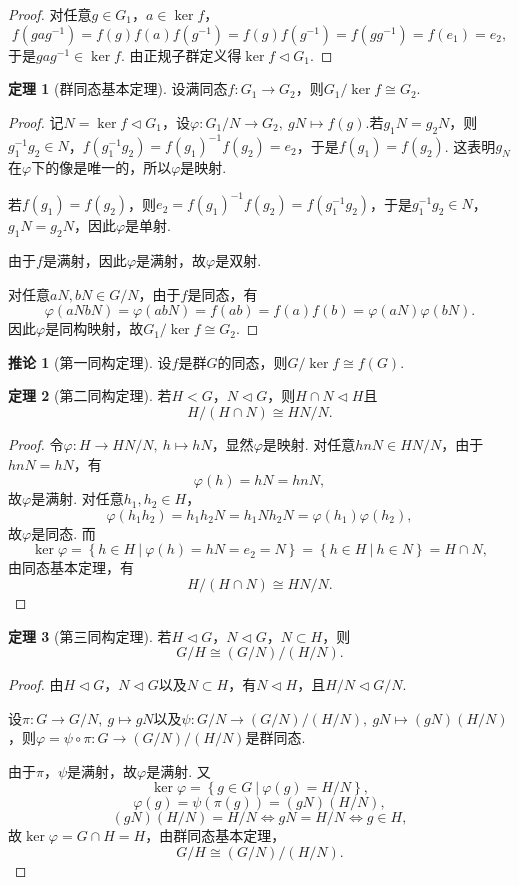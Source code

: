 \documentclass[12pt]{ctexart}
\theoremstyle{definition}
\newtheorem{theorem}{定理}[section]
\newtheorem{corollary}{推论}[section]
\theoremstyle{plain}
\begin{document}
\begin{proof}
	对任意$g\in G_1$，$a\in\ker f$，
	$$f(gag^{-1})=f(g)f(a)f(g^{-1})=f(g)f(g^{-1})=f(gg^{-1})=f(e_1)=e_2,$$
	于是$gag^{-1}\in\ker f$. 由正规子群定义得$\ker f\lhd G_1$.
\end{proof}
\begin{theorem}[群同态基本定理]
	设满同态$f:G_1\to G_2$，则$G_1/\ker f\cong G_2$.
\end{theorem}
\begin{proof}
	记$N=\ker f\lhd G_1$，设$\varphi:G_1/N\to G_2,\ gN\mapsto f(g)$.若$g_1N=g_2N$，则$g_1^{-1}g_2\in N$，$f(g_1^{-1}g_2)=f(g_1)^{-1}f(g_2)=e_2$，于是$f(g_1)=f(g_2)$. 这表明$g_N$在$\varphi$下的像是唯一的，所以$\varphi$是映射.
	
	若$f(g_1)=f(g_2)$，则$e_2=f(g_1)^{-1}f(g_2)=f(g_1^{-1}g_2)$，于是$g_1^{-1}g_2\in N$，$g_1N=g_2N$，因此$\varphi$是单射.
	
	由于$f$是满射，因此$\varphi$是满射，故$\varphi$是双射.
	
	对任意$aN,bN\in G/N$，由于$f$是同态，有
	$$\varphi(aNbN)=\varphi(abN)=f(ab)=f(a)f(b)=\varphi(aN)\varphi(bN).$$
	因此$\varphi$是同构映射，故$G_1/\ker f\cong G_2$.
\end{proof}
\begin{corollary}[第一同构定理]
	设$f$是群$G$的同态，则$G/\ker f\cong f(G)$.
\end{corollary}
\begin{theorem}[第二同构定理]
	若$H<G$，$N\lhd G$，则$H\cap N\lhd H$且
	$$H/(H\cap N)\cong HN/N.$$
\end{theorem}
\begin{proof}
	令$\varphi:H\to HN/N,\ h\mapsto hN$，显然$\varphi$是映射. 对任意$hnN\in HN/N$，由于$hnN=hN$，有$$\varphi(h)=hN=hnN,$$故$\varphi$是满射. 对任意$h_1,h_2\in H$，
	$$\varphi(h_1h_2)=h_1h_2N=h_1Nh_2N=\varphi(h_1)\varphi(h_2),$$
	故$\varphi$是同态. 而
	$$\ker\varphi=\left\{h\in H\ |\ \varphi(h)=hN=e_2=N\right\}=\left\{h\in H\ |\ h\in N\right\}=H\cap N,$$
	由同态基本定理，有
	$$H/(H\cap N)\cong HN/N.$$
\end{proof}
\begin{theorem}[第三同构定理]
	若$H\lhd G$，$N\lhd G$，$N\subset H$，则
	$$G/H\cong (G/N)/(H/N).$$
\end{theorem}
\begin{proof}
	由$H\lhd G$，$N\lhd G$以及$N\subset H$，有$N\lhd H$，且$H/N\lhd G/N$.
	
	设$\pi:G\to G/N,\ g\mapsto gN$以及$\psi:G/N\to(G/N)/(H/N),\ gN\mapsto (gN)(H/N)$，则$\varphi=\psi\circ\pi:G\to(G/N)/(H/N)$是群同态.
	
	由于$\pi$，$\psi$是满射，故$\varphi$是满射. 又
	$$\ker\varphi=\left\{g\in G\ |\ \varphi(g)=H/N\right\},$$
	$$\varphi(g)=\psi(\pi(g))=(gN)(H/N),$$
	$$(gN)(H/N)=H/N\iff gN=H/N\iff g\in H,$$
	故$\ker\varphi=G\cap H=H$，由群同态基本定理，
	$$G/H\cong (G/N)/(H/N).$$
\end{proof}
\end{document}

